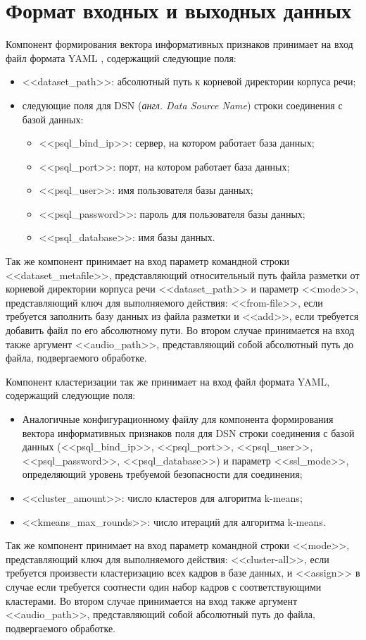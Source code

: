 \section{Формат входных и выходных данных}  
Компонент формирования вектора информативных признаков принимает на вход файл формата YAML \cite{yaml}, содержащий следующие поля:
\begin{itemize}
	\item <<dataset\_path>>: абсолютный путь к корневой директории корпуса речи;
	\item следующие поля для DSN (\textit{англ. Data Source Name}) строки соединения с базой данных:
	\begin{itemize}
		\item <<psql\_bind\_ip>>: сервер, на котором работает база данных;
		\item <<psql\_port>>: порт, на котором работает база данных;
		\item <<psql\_user>>: имя пользователя базы данных;
		\item <<psql\_password>>: пароль для пользователя базы данных;
		\item <<psql\_database>>: имя базы данных.
	\end{itemize}
\end{itemize}
Так же компонент принимает на вход параметр командной строки <<dataset\_metafile>>, представляющий относительный путь файла разметки от корневой директории корпуса речи <<dataset\_path>> и параметр <<mode>>, представляющий ключ для выполняемого действия: <<from-file>>, если требуется заполнить базу данных из файла разметки и <<add>>, если требуется добавить файл по его абсолютному пути. Во втором случае принимается на вход также аргумент <<audio\_path>>, представляющий собой абсолютный путь до файла, подвергаемого обработке.

Компонент кластеризации так же принимает на вход файл формата YAML, содержащий следующие поля:
\begin{itemize}
	\item Аналогичные конфигурационному файлу для компонента формирования вектора информативных признаков поля для DSN строки соединения с базой данных (<<psql\_bind\_ip>>, <<psql\_port>>, <<psql\_user>>, <<psql\_password>>, <<psql\_database>>) и параметр <<ssl\_mode>>, определяющий уровень требуемой безопасности для соединения;
	\item <<cluster\_amount>>: число кластеров для алгоритма k-means;
	\item <<kmeans\_max\_rounds>>: число итераций для алгоритма k-means.
\end{itemize}
Так же компонент принимает на вход параметр командной строки <<mode>>, представляющий ключ для выполняемого действия: <<cluster-all>>, если требуется произвести кластеризацию всех кадров в базе данных, и <<assign>> в случае если требуется соотнести один набор кадров с соответствующими кластерами. Во втором случае принимается на вход также аргумент <<audio\_path>>, представляющий собой абсолютный путь до файла, подвергаемого обработке.

